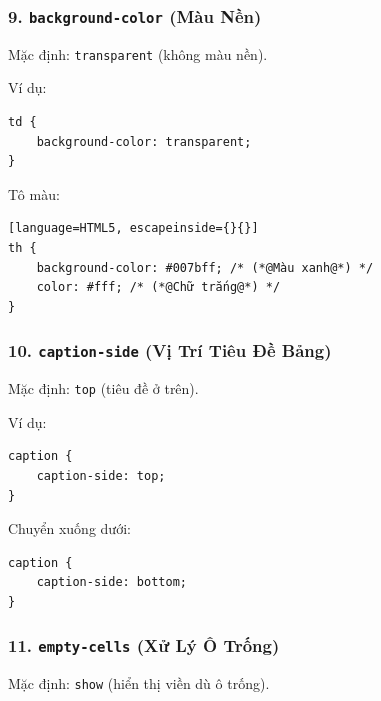 \documentclass[11pt,oneside]{book}
\newcommand{\codeinline}[1]{\textcolor{accentOrange}{\texttt{#1}}}
\begin{document}
\subsubsection{9. \codeinline{background-color} (Màu Nền)}

Mặc định: \codeinline{transparent} (không màu nền).

Ví dụ:
\begin{codeWindow}
\begin{lstlisting}[language=HTML5]
td {
    background-color: transparent;
}
\end{lstlisting}
\end{codeWindow}

Tô màu:
\begin{codeWindow}
\begin{lstlisting}[language=HTML5, escapeinside={}{}]
th {
    background-color: #007bff; /* (*@Màu xanh@*) */
    color: #fff; /* (*@Chữ trắng@*) */
}
\end{lstlisting}
\end{codeWindow}

\subsubsection{10. \codeinline{caption-side} (Vị Trí Tiêu Đề Bảng)}

Mặc định: \codeinline{top} (tiêu đề ở trên).

Ví dụ:
\begin{codeWindow}
\begin{lstlisting}[language=HTML5]
caption {
    caption-side: top;
}
\end{lstlisting}
\end{codeWindow}

Chuyển xuống dưới:
\begin{codeWindow}
\begin{lstlisting}[language=HTML5]
caption {
    caption-side: bottom;
}
\end{lstlisting}
\end{codeWindow}

\subsubsection{11. \codeinline{empty-cells} (Xử Lý Ô Trống)}

Mặc định: \codeinline{show} (hiển thị viền dù ô trống).
\end{document}
